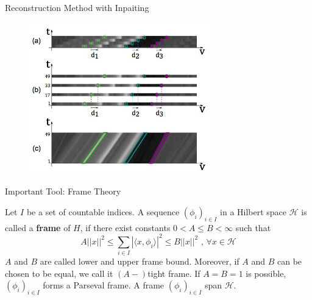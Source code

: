 \begin{frame}{Reconstruction Method with Inpaiting}
\begin{block}{}
\begin{figure}[h!]
\includegraphics[width=0.7\textwidth]{../../Diagrams/sparse_EPI.jpg}
\end{figure}
\end{block}
\end{frame}

\begin{frame}{Important Tool: Frame Theory}
\begin{definition}[Frame]
Let $I$ be a set of countable indices. A sequence $(\phi_i)_{i\in I}$ in a Hilbert space $\mathcal{H}$ is called a \textbf{frame} of $H$, if there exist constants $0< A\leq B<\infty$ such that
$$
A||x||^2\leq\sum_{i\in I}|\langle x,\phi_i\rangle|^2\leq B||x||^2 \text{  ,  } \forall x\in\mathcal{H}
$$
$A$ and $B$ are called lower and upper frame bound. Moreover, if $A$ and $B$ can be chosen to be equal, we call it $(A-)$tight frame. If $A=B=1$ is possible, $(\phi_i)_{i\in I}$ forms a Parseval frame. A frame $(\phi_i)_{i\in I}$ span $\mathcal{H}$. 
\end{definition}
\end{frame}

